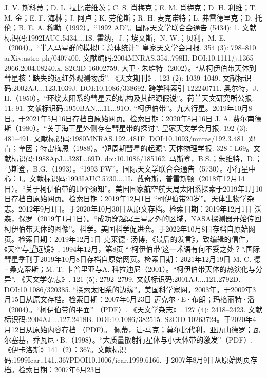 \begin{enumerate}
 J. V. 斯科蒂；D. L. 拉比诺维茨；C. S. 肖梅克；E. M. 肖梅克；D. H. 利维；T. M. 金；E. F. 海林；J. 阿卢；K. 劳伦斯；R. H. 麦克诺特；L. 弗雷德里克；D. 托伦；B. E. A. 穆勒（1992）。“1992 AD”。国际天文学联合会通告 (5434): 1. 文献标识码:1992IAUC.5434....1S.
 霍纳，J.；埃文斯，N. W.；贝利，M. E.（2004）。“半人马星群的模拟Ⅰ：总体统计”. 皇家天文学会月报. 354 (3): 798–810. arXiv:astro-ph/0407400. 文献编码:2004MNRAS.354..798H. DOI:10.1111/j.1365-2966.2004.08240.x. S2CID 16002759.
 大卫·朱维特（2002）。“从柯伊伯带天体到彗星核：缺失的远红外观测物质”. 《天文期刊》. 123 (2): 1039–1049. 文献标识码:2002AJ....123.1039J. DOI:10.1086/338692. 跨学科索引 122240711.
 奥尔特，J. H.（1950）。“环绕太阳系的彗星云的结构及其起源假说”。荷兰天文研究所公报. 11: 91. 文献标识码:1950BAN....11...91O.
 “柯伊伯带”。九大行星。2019年10月8日。于2021年5月16日存档自原始网页。检索日期：2020年8月16日
 J. A. 费尔南德斯（1980）。“关于海王星外侧存在彗星带的探讨”. 皇家天文学会月报. 192 (3): 481–491. 文献标识码:1980MNRAS.192..481F. DOI:10.1093/mnras/192.3.481.
 邓肯；奎因；特雷梅恩（1988）。“短周期彗星的起源”. 天体物理学报. 328：L69。文献标识码:1988ApJ...328L..69D. doi:10.1086/185162.
 马斯登，B.S.；朱维特，D.；马斯登，B.G.（1993）。“1993 FW”。国际天文学联合会通告（5730）。小行星中心：1。文献标识码:1993IAUC.5730....1L.
 戴奇斯，普雷斯顿（2018年12月14日）。“关于柯伊伯带的10个须知”。美国国家航空航天局太阳系探索于2019年1月10日存档自原始网页。检索日期：2019年12月1日
 “柯伊伯带20岁”。天体生物学杂志。2012年9月1日。于2020年10月30日从原文存档。检索日期：2019年12月1日
 沃森，保罗（2019年1月1日）。“成功穿越冥王星之外的区域，NASA探测器开始传回柯伊伯带天体的图像”。科学。美国科学促进会。于2022年10月8日存档自原始网页。检索日期：2019年12月1日
 克莱德·汤博，《最后的发言》，致编辑的信件，《天空与望远镜》, 1994年12月，第8页
 “‘柯伊伯带’这一术语有何不妥之处？”.国际彗星季刊于2019年10月8日存档自原始网页。检索日期：2021年12月19日
 M. C. 德·桑克蒂斯；M. T. 卡普里亚与A. 科拉迪尼（2001）。“柯伊伯带天体的热演化与分异”. 《天文学杂志》. 121 (5): 2792–2799. 文献标识码:2001AJ....121.2792D. DOI:10.1086/320385.
 “探索太阳系的边缘”。美国科学家网。2003年。于2009年3月15日从原文存档。检索日期：2007年6月23日
 迈克尔·E·布朗；玛格丽特·潘（2004）。“柯伊伯带的平面” （PDF）. 《天文学杂志》. 127 (4): 2418–2423. 文献标识码:2004AJ....127.2418B. DOI:10.1086/382515. S2CID 10263724。于2020年4月12日从原始内容存档 （PDF）。
 佩蒂，让-马克；莫尔比代利，亚历山德罗；瓦尔塞基，乔瓦尼·B.（1998）。“大质量散射行星体与小天体带的激发”（PDF）.《伊卡洛斯》141（2）：367。文献标识码:1999Icar..141..367PDOI10.1006/icar.1999.6166. 于2007年8月9日从原始网页存档。检索日期：2007年6月23日

\end{enumerate}
